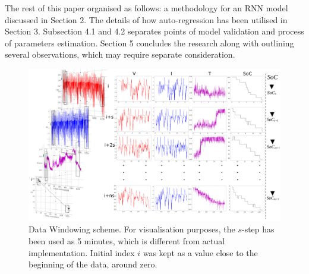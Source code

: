 %
%
The rest of this paper organised as follows: a methodology for an RNN model discussed in Section 2.
The details of how auto-regression has been utilised in Section 3. Subsection 4.1 and 4.2 separates points of model validation and process of parameters estimation.
Section 5 concludes the research along with outlining several observations, which may require separate consideration.
\begin{landscape}
    \begin{figure}[ht]
        \centering
        \includegraphics[width=0.9\linewidth]{II_Body/images/Windowing3D-1.jpg}
        \caption{Data Windowing scheme. For visualisation purposes, the $s$-step has been used as 5 minutes, which is different from actual implementation. Initial index $i$ was kept as a value close to the beginning of the data, around zero.}
        \label{fig:Windowing}
    \end{figure}
\end{landscape}